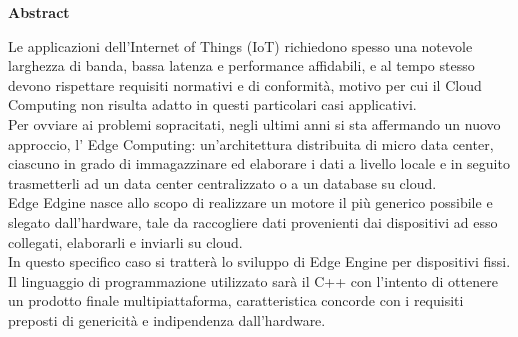 \null{}
\begin{center}
	\huge{\textbf{Abstract}}
\end{center}
Le applicazioni dell'Internet of Things (IoT) richiedono spesso una notevole larghezza di banda, bassa latenza e performance affidabili, e al tempo stesso devono rispettare requisiti normativi e di conformità, motivo per cui il Cloud Computing non risulta adatto in questi particolari casi applicativi.\\
Per ovviare ai problemi sopracitati, negli ultimi anni si sta affermando un nuovo approccio, l' Edge Computing: un’architettura distribuita di micro data center, ciascuno in grado di immagazzinare ed elaborare i dati a livello locale e in seguito trasmetterli ad un data center centralizzato o a un database su cloud.\\
Edge Edgine nasce allo scopo di realizzare un motore il più generico possibile e slegato dall'hardware, tale da raccogliere dati provenienti dai dispositivi ad esso collegati, elaborarli e inviarli su cloud.\\
In questo specifico caso si tratterà lo sviluppo di Edge Engine per dispositivi fissi. Il linguaggio di programmazione utilizzato sarà il C++ con l'intento di ottenere un prodotto finale multipiattaforma, caratteristica concorde con i requisiti preposti di genericità e indipendenza dall'hardware.
\null{}


